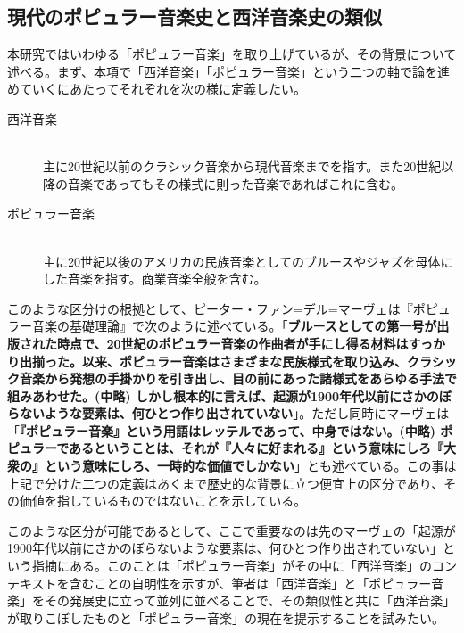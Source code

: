 \documentclass[uplatex,dvipdfmx]{ujarticle}
\begin{document}
\subsection{現代のポピュラー音楽史と西洋音楽史の類似}

本研究ではいわゆる「ポピュラー音楽」を取り上げているが、その背景について述べる。まず、本項で「西洋音楽」「ポピュラー音楽」という二つの軸で論を進めていくにあたってそれぞれを次の様に定義したい。

\begin{description}
 \item[西洋音楽]\mbox{}\\
	    主に20世紀以前のクラシック音楽から現代音楽までを指す。また20世紀以降の音楽であってもその様式に則った音楽であればこれに含む。
 \item[ポピュラー音楽]\mbox{}\\
	    主に20世紀以後のアメリカの民族音楽としてのブルースやジャズを母体にした音楽を指す。商業音楽全般を含む。
\end{description}

このような区分けの根拠として、ピーター・ファン=デル=マーヴェは『ポピュラー音楽の基礎理論』で次のように述べている。「{\bf ブルースとしての第一号が出版された時点で、20世紀のポピュラー音楽の作曲者が手にし得る材料はすっかり出揃った。以来、ポピュラー音楽はさまざまな民族様式を取り込み、クラシック音楽から発想の手掛かりを引き出し、目の前にあった諸様式をあらゆる手法で組みあわせた。(中略) しかし根本的に言えば、起源が1900年代以前にさかのぼらないような要素は、何ひとつ作り出されていない}」\cite{merwe:01}。ただし同時にマーヴェは「{\bf『ポピュラー音楽』という用語はレッテルであって、中身ではない。(中略) ポピュラーであるということは、それが『人々に好まれる』という意味にしろ『大衆の』という意味にしろ、一時的な価値でしかない}」\cite{merwe:01}とも述べている。この事は上記で分けた二つの定義はあくまで歴史的な背景に立つ便宜上の区分であり、その価値を指しているものではないことを示している。

このような区分が可能であるとして、ここで重要なのは先のマーヴェの「起源が1900年代以前にさかのぼらないような要素は、何ひとつ作り出されていない」という指摘にある。このことは「ポピュラー音楽」がその中に「西洋音楽」のコンテキストを含むことの自明性を示すが、筆者は「西洋音楽」と「ポピュラー音楽」をその発展史に立って並列に並べることで、その類似性と共に「西洋音楽」が取りこぼしたものと「ポピュラー音楽」の現在を提示することを試みたい。
\end{document}
